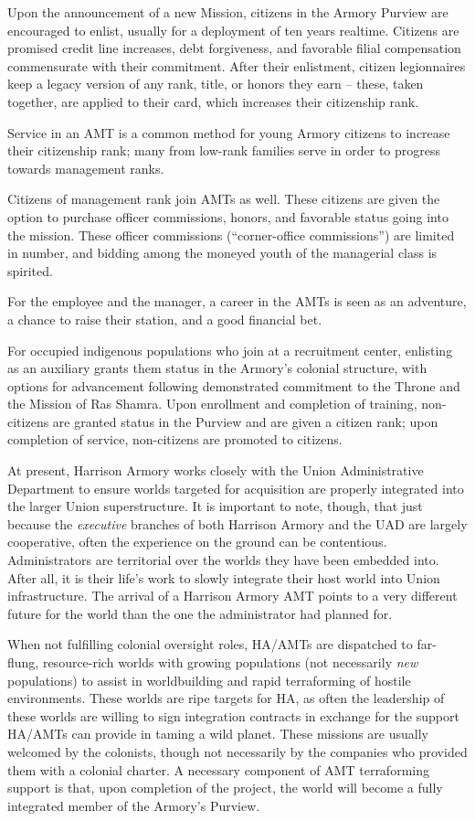 Upon the announcement of a new Mission, citizens in the Armory Purview are encouraged to
enlist, usually for a deployment of ten years realtime. Citizens are promised credit line increases,
debt forgiveness, and favorable filial compensation commensurate with their commitment. After
their enlistment, citizen legionnaires keep a legacy version of any rank, title, or honors they earn
-- these, taken together, are applied to their card, which increases their citizenship rank.

Service in an AMT is a common method for young Armory citizens to increase their citizenship
rank; many from low-rank families serve in order to progress towards management ranks.

Citizens of management rank join AMTs as well. These citizens are given the option to purchase
officer commissions, honors, and favorable status going into the mission. These officer
commissions (``corner-office commissions'') are limited in number, and bidding among the
moneyed youth of the managerial class is spirited.

For the employee and the manager, a career in the AMTs is seen as an adventure, a chance to
raise their station, and a good financial bet.

For occupied indigenous populations who join at a recruitment center, enlisting as an auxiliary
grants them status in the Armory's colonial structure, with options for advancement following
demonstrated commitment to the Throne and the Mission of Ras Shamra. Upon enrollment and
completion of training, non-citizens are granted status in the Purview and are given a citizen
rank; upon completion of service, non-citizens are promoted to citizens.

At present, Harrison Armory works closely with the Union Administrative Department to ensure
worlds targeted for acquisition are properly integrated into the larger Union superstructure. It is
important to note, though, that just because the \textit{executive} branches of both Harrison Armory and
the UAD are largely cooperative, often the experience on the ground can be contentious.
Administrators are territorial over the worlds they have been embedded into. After all, it is their
life's work to slowly integrate their host world into Union infrastructure. The arrival of a Harrison
Armory AMT points to a very different future for the world than the one the administrator had
planned for.

When not fulfilling colonial oversight roles, HA/AMTs are dispatched to far-flung, resource-rich
worlds with growing populations (not necessarily \textit{new} populations) to assist in worldbuilding and
rapid terraforming of hostile environments. These worlds are ripe targets for HA, as often the
leadership of these worlds are willing to sign integration contracts in exchange for the support
HA/AMTs can provide in taming a wild planet. These missions are usually welcomed by the
colonists, though not necessarily by the companies who provided them with a colonial charter. A
necessary component of AMT terraforming support is that, upon completion of the project, the
world will become a fully integrated member of the Armory's Purview.

